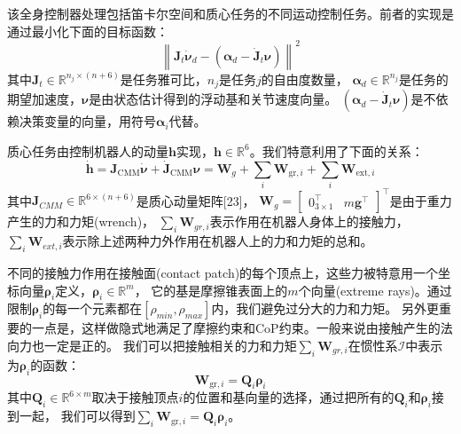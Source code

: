 该全身控制器处理包括笛卡尔空间和质心任务的不同运动控制任务。前者的实现是通过最小化下面的目标函数：
\begin{equation}
    \label{equ:qp_objective}
    \left\|\boldsymbol{J}_t \dot{\boldsymbol{\nu}}_d-\left(\boldsymbol{\alpha}_d-\dot{\boldsymbol{J}}_t \boldsymbol{\nu}\right)\right\|^2
\end{equation}
其中$\boldsymbol{J}_t \in \mathbb{R}^{n_j \times (n+6)}$是任务雅可比，$n_j$是任务$j$的自由度数量，
$\boldsymbol{\alpha}_d \in \mathbb{R}^{n_j}$是任务的期望加速度，$\boldsymbol{\nu}$是由状态估计得到的浮动基和关节速度向量。
$\left(\boldsymbol{\alpha}_d-\dot{\boldsymbol{J}}_t \boldsymbol{\nu}\right)$是不依赖决策变量的向量，用符号$\boldsymbol{\alpha}_i$代替。

质心任务由控制机器人的动量$\boldsymbol{h}$实现，$\boldsymbol{h} \in \mathbb{R}^{6}$。我们特意利用了下面的关系：
\begin{equation}
    \label{equ:qp_momentum}
    \dot{\boldsymbol{h}}=\boldsymbol{J}_{\mathrm{CMM}} \dot{\boldsymbol{\nu}}+\dot{\boldsymbol{J}}_{\mathrm{CMM}} \boldsymbol{\nu}=\boldsymbol{W}_g+\sum_i \boldsymbol{W}_{\mathrm{gr}, i}+\sum_i \boldsymbol{W}_{\mathrm{ext}, i}
\end{equation}
其中$\boldsymbol{J}_{CMM} \in \mathbb{R}^{6 \times (n+6)}$是质心动量矩阵[23]，
$\boldsymbol{W}_g=\left[\begin{array}{ll}0_{3 \times 1}^{\top} & m \boldsymbol{g}^{\top}\end{array}\right]^{\top}$是由于重力产生的力和力矩(wrench)，
$\sum_i {\boldsymbol{W}_{gr,i}}$表示作用在机器人身体上的接触力，$\sum_i {\boldsymbol{W}_{ext,i}}$表示除上述两种力外作用在机器人上的力和力矩的总和。

不同的接触力作用在接触面(contact patch)的每个顶点上，这些力被特意用一个坐标向量$\boldsymbol{\rho}_i$定义，$\boldsymbol{\rho}_i \in \mathbb{R}^{m}$，
它的基是摩擦锥表面上的$m$个向量(extreme rays)。通过限制$\boldsymbol{\rho}_i$的每一个元素都在$\left[\rho_{min}, \rho_{max}\right]$内，我们避免过分大的力和力矩。
另外更重要的一点是，这样做隐式地满足了摩擦约束和CoP约束。一般来说由接触产生的法向力也一定是正的。
我们可以把接触相关的力和力矩$\sum_i {\boldsymbol{W}_{gr,i}}$在惯性系$\mathcal{I}$中表示为$\boldsymbol{\rho}_i$的函数：
\begin{equation}
    \label{equ:qp_grf_coord}
    \boldsymbol{W}_{\mathrm{gr}, i}=\boldsymbol{Q}_i \boldsymbol{\rho}_i
\end{equation}
其中$\boldsymbol{Q}_i \in \mathbb{R}^{6 \times m}$取决于接触顶点$i$的位置和基向量的选择，通过把所有的$\boldsymbol{Q}_i$和$\boldsymbol{\rho}_i$接到一起，
我们可以得到$\sum_i {\boldsymbol{W}_{\mathrm{gr}, i}}=\boldsymbol{Q}_i \boldsymbol{\rho}_i$。

